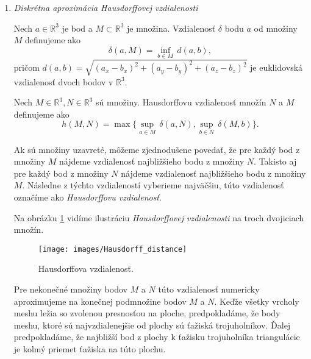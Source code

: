 \begin{enumerate}
{    Odmeriame priemerný pomer najväčšej a najmenšej strany a budeme sledovať, či sa pri 
    zmenšujúcej dĺžke $a$ zmenšuje, resp. blíži zhora k $1$.

    Kritérium budeme označovať $k_3$.
}
\item{
    \textit{Diskrétna aproximácia Hausdorffovej vzdialenosti}

    \begin{definition}
        Nech $a \in \mathbb{R}^3$ je bod a $M \subset \mathbb{R}^3$ je množina.
        Vzdialenosť $\delta$ bodu $a$ od množiny $M$ definujeme ako
        \begin{equation}
            \delta(a, M) = \inf_{b \in M} \, d(a, b),
        \end{equation}
        pričom $d(a, b) = \sqrt{(a_x-b_x)^2 + (a_y-b_y)^2 + (a_z-b_z)^2}$ je euklidovská 
        vzdialenosť dvoch bodov v $\mathbb{R}^3$.
    \end{definition}

    \begin{definition}
        Nech $M \in \mathbb{R}^3, N \in \mathbb{R}^3$ sú množiny.
        Hausdorffovu vzdialenosť množín $N$ a $M$ definujeme ako
        \begin{equation}
            h(M, N) = \max \big \{\sup_{a \in M} \, \delta(a, N), \sup_{b \in N} \, \delta(M, b) \big \}.
        \end{equation}
    \end{definition}

    Ak sú množiny uzavreté, môžeme zjednodušene povedať, že pre každý bod z množiny $M$ nájdeme 
    vzdialenosť najbližšieho bodu z množiny $N$.
    Takisto aj pre každý bod z množiny $N$ nájdeme vzdialenosť najbližšieho bodu z množiny $M$.
    Následne z týchto vzdialeností vyberieme najväčšiu, túto vzdialenosť označíme ako 
    \textit{Hausdorffovu vzdialenosť}.

    Na obrázku \ref{obr:hausdorff_distance} vidíme ilustráciu \textit{Hausdorffovej vzdialenosti} 
    na troch dvojiciach množín.

    \begin{figure}
        \centerline{\texttt{[image: images/Hausdorff\_distance]}}
        \caption[Hausdorffova vzdialenosť]{Hausdorffova vzdialenosť.}
        \label{obr:hausdorff_distance}
    \end{figure}


    Pre nekonečné množiny bodov $M$ a $N$ túto vzdialenosť numericky aproximujeme na konečnej 
    podmnožine bodov $M$ a $N$. Keďže všetky vrcholy meshu ležia so zvolenou presnosťou na ploche, 
    predpokladáme, že body meshu, ktoré sú najvzdialenejšie od plochy sú ťažiská trojuholníkov.
    Ďalej predpokladáme, že najbližší bod z plochy k ťažisku trojuholníka triangulácie
    je kolmý priemet ťažiska na túto plochu.

}
\end{enumerate}
